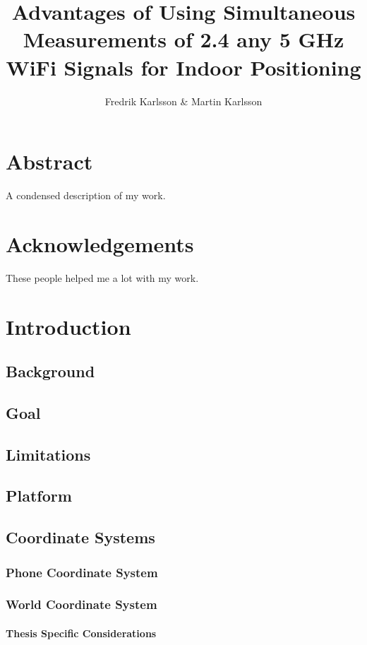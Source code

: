 \documentclass{LTHthesis}
\begin{document}
\begin{titlepages}
\author{Fredrik Karlsson \& Martin Karlsson}
\title{Advantages of Using Simultaneous Measurements of 2.4 any 5 GHz WiFi Signals for Indoor Positioning}%
\end{titlepages}
\chapter*{Abstract}
A condensed description of my work.
\chapter*{Acknowledgements}
These people helped me a lot with my work.
\tableofcontents
\chapter{Introduction}
\section{Background}
\section{Goal}
\section{Limitations}
\section{Platform}
\section{Coordinate Systems}
\subsection{Phone Coordinate System}
\subsection{World Coordinate System}
\subsubsection{Thesis Specific Considerations}
\end{document}

